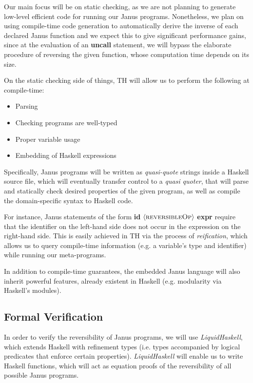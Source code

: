 \documentclass[12pt,a4paper]{article}
\begin{document}
Our main focus will be on static checking, as we are not planning to generate low-level efficient code for running our Janus programs. Nonetheless, we plan on using compile-time code generation to automatically derive the inverse of each declared Janus function and we expect this to give significant performance gains, since at the evaluation of an \textbf{uncall} statement, we will bypass the elaborate procedure of reversing the given function, whose computation time depends on its size.

On the static checking side of things, TH will allow us to perform the following at compile-time:
\begin{itemize}
	\item{Parsing}
	\item{Checking programs are well-typed}
	\item{Proper variable usage}
	\item{Embedding of Haskell expressions}
\end{itemize}

Specifically, Janus programs will be written as \textit{quasi-quote} strings inside a Haskell source file, which will eventually transfer control to a \textit{quasi quoter}, that will parse and statically check desired properties of the given program, as well as compile the domain-specific syntax to Haskell code.

For instance, Janus statements of the form \textbf{id} $\langle\textsc{reversibleOp}\rangle$ \textbf{expr} require that the identifier on the left-hand side does not occur in the expression on the right-hand side. This is easily achieved in TH via the process of \textit{reification}, which allows us to query compile-time information (e.g. a variable's type and identifier) while running our meta-programs.

In addition to compile-time guarantees, the embedded Janus language will also inherit powerful features, already existent in Haskell (e.g. modularity via Haskell's modules).

\subsection{Formal Verification}
\label{subsec:liquid-haskell}
In order to verify the reversibility of Janus programs, we will use \textit{LiquidHaskell}\cite{vazou16}, which extends Haskell with refinement types (i.e. types accompanied by logical predicates that enforce certain properties). \textit{LiquidHaskell} will enable us to write Haskell functions, which will act as equation proofs of the reversibility of all possible Janus programs.
\end{document}
